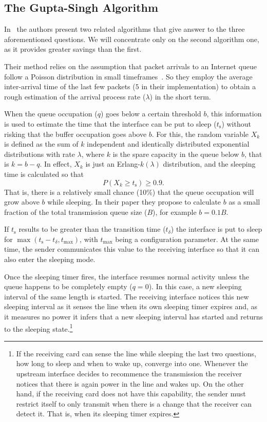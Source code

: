 \documentclass[conference,english]{IEEEtran}
\begin{document}
\subsection{The Gupta-Singh Algorithm}
\label{sec:gupta-singh-algor}

In~\cite{gupta07:_using_low_power_modes_for} the authors present two related
algorithms that give answer to the three aforementioned questions. We will
concentrate only on the second algorithm one, as it provides greater savings
than the first.

Their method relies on the assumption that packet arrivals to an Internet
queue follow a Poisson distribution in small
timeframes~\cite{karagiannis04:_nonst_poiss_view_of_inter_traff}. So they
employ the average inter-arrival time of the last few packets ($5$ in their
implementation) to obtain a rough estimation of the arrival process rate
($\lambda$) in the short term.

When the queue occupation ($q$) goes below a certain threshold $b$, this
information is used to estimate the time that the interface can be put to
sleep ($t_{\mathrm{s}}$) without risking that the buffer occupation goes above
$b$. For this, the random variable $X_k$ is defined as the sum of $k$
independent and identically distributed exponential distributions with rate
$\lambda$, where $k$ is the spare capacity in the queue below $b$, that is
$k=b-q$. In effect, $X_k$ is just an Erlang-$k(\lambda)$ distribution, and the
sleeping time is calculated so that
\begin{equation}
  \label{eq:erlang-k-incognito}
  P\left(X_k \ge t_{\mathrm{s}}\right) \ge 0.9.
\end{equation}
That is, there is a relatively small chance (10\%) that the queue occupation
will grow above $b$ while sleeping. In their paper they propose to calculate
$b$ as a small fraction of the total transmission queue size ($B$), for
example $b=0.1B$.

If $t_{\mathrm{s}}$ results to be greater than the transition time
($t_{\delta}$) the interface is put to sleep for $\max(t_{\mathrm{s}} -
t_{\delta}, t_{\max})$, with $t_{\max}$ being a configuration parameter. At
the same time, the sender communicates this value to the receiving interface
so that it can also enter the sleeping mode.

Once the sleeping timer fires, the interface resumes normal activity unless
the queue happens to be completely empty ($q = 0$). In this case,
a new sleeping interval of the same length is started. The receiving interface
notices this new sleeping interval as it senses the line when its own sleeping
timer expires and, as it measures no power it infers that a new sleeping
interval has started and returns to the sleeping state.\footnote{If the
  receiving card can sense the line while sleeping the last two questions, how
  long to sleep and when to wake up, converge into one. Whenever the upstream
  interface decides to recommence the transmission the receiver notices that
  there is again power in the line and wakes up. On the other hand, if the
  receiving card does not have this capability, the sender must restrict
  itself to only transmit when there is a change that the receiver can detect
  it. That is, when its sleeping timer expires.}
\end{document}
